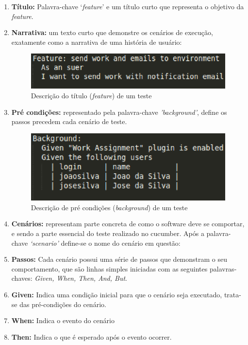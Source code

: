 \begin{enumerate}
\item \textbf{Título:} Palavra-chave ‘\textit{feature}’ e um título curto que representa o 
objetivo da \textit{feature}.
\item \textbf{Narrativa:} um texto curto que demonstre os cenários de execução, 
exatamente como a narrativa de uma história de usuário:

\begin{figure}[!h]
    \centering
    \includegraphics[keepaspectratio=true,scale=0.50]
      {figuras/noosfero_feature2.eps}
    \caption{Descrição do título (\textit{feature}) de um teste}
    \label{nosfero_feature}
\end{figure}

\item \textbf{Pré condições:} representado pela palavra-chave \textit{'background'}, define os passos 
precedem cada cenário de teste.

\begin{figure}[!h]
    \centering
    \includegraphics[keepaspectratio=true,scale=0.50]
      {figuras/noosfero_back.eps}
    \caption{Descrição de pré condições (\textit{background}) de um teste}
    \label{nosfero_feature}
\end{figure}

\item \textbf{Cenários:} representam parte concreta de como o software deve se 
comportar, e sendo a parte essencial do teste realizado no 
cucumber. Após a palavra-chave \textit{‘scenario’} define-se o nome do cenário em questão:
\item \textbf{Passos:} Cada cenário possui uma série de passos que demonstram o seu 
comportamento, que são linhas simples iniciadas com as seguintes palavras-chaves: 
\textit{Given, When, Then, And, But}.
\item \textbf{Given:} Indica uma condição inicial para que o cenário seja executado, 
trata-se das pré-condições do cenário.
\item \textbf{When:} Indica o evento do cenário
\item \textbf{Then:} Indica o que é esperado após o evento ocorrer.


\end{enumerate}
